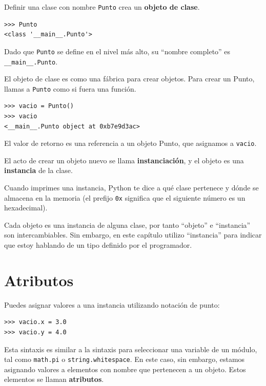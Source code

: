 \documentclass[10pt]{book}
\begin{document}
Definir una clase con nombre {\tt Punto} crea un {\bf objeto de clase}.

\begin{verbatim}
>>> Punto
<class '__main__.Punto'>
\end{verbatim}
%
Dado que {\tt Punto} se define en el nivel más alto, su ``nombre
completo'' es \verb"__main__.Punto".

El objeto de clase es como una fábrica para crear objetos.  Para crear un
Punto, llamas a {\tt Punto} como si fuera una función.

\begin{verbatim}
>>> vacio = Punto()
>>> vacio
<__main__.Punto object at 0xb7e9d3ac>
\end{verbatim}
%
El valor de retorno es una referencia a un objeto Punto, que
asignamos a {\tt vacio}.

El acto de crear un objeto nuevo se llama
{\bf instanciación}, y el objeto es una {\bf instancia} de
la clase.

Cuando imprimes una instancia, Python te dice a qué clase
pertenece y dónde se almacena en la memoria (el prefijo
{\tt 0x} significa que el siguiente número es un hexadecimal).

Cada objeto es una instancia de alguna clase, por tanto ``objeto'' e
``instancia'' son intercambiables.  Sin embargo, en este capítulo utilizo
``instancia'' para indicar que estoy hablando de un tipo definido por el
programador.


\section{Atributos}
\label{attributes}

Puedes asignar valores a una instancia utilizando notación de punto:

\begin{verbatim}
>>> vacio.x = 3.0
>>> vacio.y = 4.0
\end{verbatim}
%
Esta sintaxis es similar a la sintaxis para seleccionar una variable de un
módulo, tal como {\tt math.pi} o {\tt string.whitespace}.  En este caso,
sin embargo, estamos asignando valores a elementos con nombre que pertenecen a un objeto.
Estos elementos se llaman {\bf atributos}.

\end{document}
